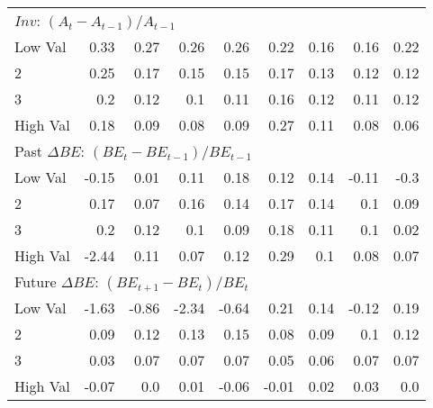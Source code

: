 \begin{table}[!ht]
\begin{tabular}{lrrrrrrrr}
    \multicolumn{9}{l}{$Inv$: $(A_t - A_{t-1}) / A_{t-1}$} \\
    Low Val    & 0.33  & 0.27  & 0.26  & 0.26  & 0.22  & 0.16  & 0.16  & 0.22  \\
           2   & 0.25  & 0.17  & 0.15  & 0.15  & 0.17  & 0.13  & 0.12  & 0.12  \\
           3   & 0.2  & 0.12  & 0.1  & 0.11  & 0.16  & 0.12  & 0.11  & 0.12  \\
    High Val   & 0.18  & 0.09  & 0.08  & 0.09  & 0.27  & 0.11  & 0.08  & 0.06  \\
    [1em]
  

    \multicolumn{9}{l}{Past $\Delta BE$: $(BE_t - BE_{t-1}) / BE_{t-1}$} \\
    Low Val    & -0.15  & 0.01  & 0.11  & 0.18  & 0.12  & 0.14  & -0.11  & -0.3  \\
           2   & 0.17  & 0.07  & 0.16  & 0.14  & 0.17  & 0.14  & 0.1  & 0.09  \\
           3   & 0.2  & 0.12  & 0.1  & 0.09  & 0.18  & 0.11  & 0.1  & 0.02  \\
    High Val   & -2.44  & 0.11  & 0.07  & 0.12  & 0.29  & 0.1  & 0.08  & 0.07  \\
    [1em]
  

    \multicolumn{9}{l}{Future $\Delta BE$: $(BE_{t+1} - BE_t) / BE_t$} \\
    Low Val    & -1.63  & -0.86  & -2.34  & -0.64  & 0.21  & 0.14  & -0.12  & 0.19  \\
           2   & 0.09  & 0.12  & 0.13  & 0.15  & 0.08  & 0.09  & 0.1  & 0.12  \\
           3   & 0.03  & 0.07  & 0.07  & 0.07  & 0.05  & 0.06  & 0.07  & 0.07  \\
    High Val   & -0.07  & 0.0  & 0.01  & -0.06  & -0.01  & 0.02  & 0.03  & 0.0  \\
    [1em]
  

  \bottomrule
\end{tabular}
\label{tbl:32_Size_BM_Prior_Sorts}
\end{table}